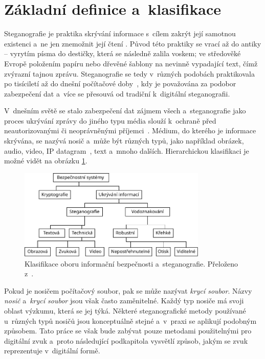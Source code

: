 \section{Základní definice a~klasifikace}
\label{sec:definitions}

Steganografie je praktika skrývání informace s~cílem zakrýt její samotnou
existenci a~ne jen znemožnit její čtení
\cite{AlSabhany2020}\cite{Anderson1998}\cite{Djebbar2012}\cite{Dutta2020}.
Původ této praktiky se vrací až do antiky -- vyrytím písma do destičky, která
se následně zalila voskem; ve středověké Evropě položením papíru nebo dřevěné
šablony na nevinně vypadající text, čímž zvýrazní tajnou zprávu. Steganografie
se tedy v~různých podobách praktikovala po tisíciletí až do dnešní počítačové
doby~\cite{Anderson1998}, kdy je považována za podobor zabezpečení dat
\cite{Djebbar2012} a~více se přesouvá od tradiční k~digitální steganografii.

V~dnešním světě se stalo zabezpečení dat zájmem všech a~steganografie jako
proces ukrývání zprávy do jiného typu média slouží k~ochraně před
neautorizovanými či neoprávněnými příjemci~\cite{Dutta2020}. Médium, do kterého
je informace skrývána, se nazývá nosič a~může být různých typů, jako například
obrázek, audio, video, IP datagram~\cite{Dutta2020}, text a~mnoho dalších.
Hierarchickou klasifikaci je možné vidět na obrázku
\ref{pic:steganography-classification}.

\begin{figure}[hbt]
    \centering
    \includegraphics[width=0.8\textwidth]{obrazky/steganography-classification.pdf}
    \caption{Klasifikace oboru informační bezpečnosti a~steganografie.
    Přeloženo z~\cite{Majeed2021}.}
    \label{pic:steganography-classification}
\end{figure}

Pokud je nosičem počítačový soubor, pak se může nazývat \textit{krycí soubor}.
Názvy \textit{nosič} a~\textit{krycí soubor} jsou však často zaměnitelné. Každý
typ nosiče má svoji oblast výzkumu, která se jej týká. Některé steganografické
metody používané u~různých typů nosičů jsou konceptuálně stejné a~v~praxi se
aplikují podobným způsobem. Tato práce se však bude zabývat pouze metodami
použitelnými pro digitální zvuk a~proto následující podkapitola vysvětlí
způsob, jakým se zvuk reprezentuje v~digitální formě.

